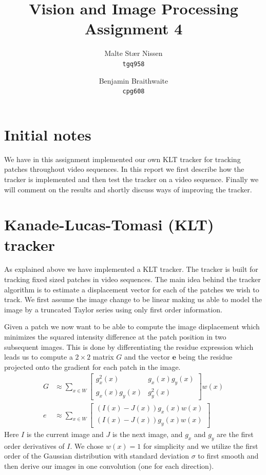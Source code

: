 \documentclass[11pt,a4paper]{article}
\title{Vision and Image Processing\\Assignment 4}
\author{Malte Stær Nissen    \\ \texttt{tgq958} \and
        Benjamin Braithwaite \\ \texttt{cpg608}}
\begin{document}
\maketitle

\section{Initial notes}
%
We have in this assignment implemented our own KLT tracker for tracking patches
throughout video sequences. In this report we first describe how the
tracker is implemented and then test the tracker on a video sequence.
Finally we will comment on the results and shortly discuss ways of improving the
tracker.
%
\section{Kanade-Lucas-Tomasi (KLT) tracker}
%
As explained above we have implemented a KLT tracker. The tracker is built for
tracking fixed sized patches in video sequences. The main idea behind the
tracker algorithm is to estimate a displacement vector for each of the patches we
wish to track. We first assume the image change to be linear making us able to
model the image by a truncated Taylor series using only first order information.

Given a patch we now want to be able to compute the image displacement which
minimizes the squared intensity difference at the patch position in two
subsequent images. This is done by differentiating the residue expression which
leads us to compute a $2\times2$ matrix $G$ and the vector $\boldsymbol{e}$ being the residue
projected onto the gradient for each patch in the image.
\begin{align*}
    G &\approx \sum_{x \in W}
        \begin{bmatrix}
                g_x^2(x)      & g_x(x) g_y(x) \\
                g_x(x) g_y(x) & g_y^2(x)
        \end{bmatrix} w(x) \\
    e &\approx \sum_{x \in W}
    \begin{bmatrix}
        (I(x) - J(x)) g_x(x) w(x) \\
        (I(x) - J(x)) g_y(x) w(x)
    \end{bmatrix}
\end{align*}
Here $I$ is the current image and $J$ is the next image, and $g_x$ and
$g_y$ are the first order derivatives of $I$. We chose $w(x) = 1$ for
simplicity and we utilize the first order of the Gaussian distribution with
standard deviation $\sigma$ to first smooth and then derive our images in one
convolution (one for each direction).
\end{document}
